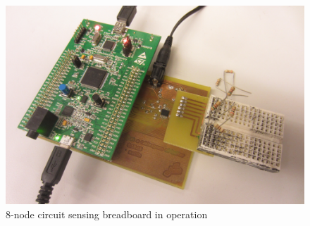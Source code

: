 \documentclass[11pt,twoside]{mitthesis}
\begin{document}
\begin{figure}[h]
  \begin{center}
      \includegraphics[width=.55\textwidth]{../system.png}
      \caption{8-node circuit sensing breadboard in operation}
  \end{center}
\end{figure}


\ifdefined\DEBUG
\end{document}
